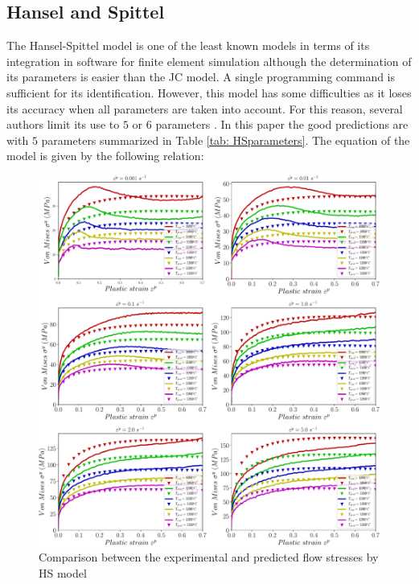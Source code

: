 \documentclass[twoside,english,1p,final,sort&compress]{elsarticle}
\theoremstyle{plain}
\begin{document}
\subsection{Hansel and Spittel\label{sec:HSmodel}}
The Hansel-Spittel model is one of the least known models in terms of its  integration in software for finite element simulation although the determination of its parameters is easier than the JC model. A single programming command is sufficient for its identification. However, this model has some difficulties as it loses its accuracy when all parameters are taken into account. For this reason, several authors limit its use to $5$ or $6$ parameters \cite{Chadha-2018, Rudnytskyj-2020, Mehtedi-2015}. In this paper the good predictions are with $5$ parameters summarized in Table \ref{tab: HSparameters}. The equation of the model is given by the following relation:
\begin{figure}[!ht]
\centering
\includegraphics[width=1.02\columnwidth]
{Figures/CompExpHS}
\caption{Comparison between the experimental and predicted flow stresses by HS model}
\label{fig:iCorrelationHS}
\end{figure}
\end{document}
